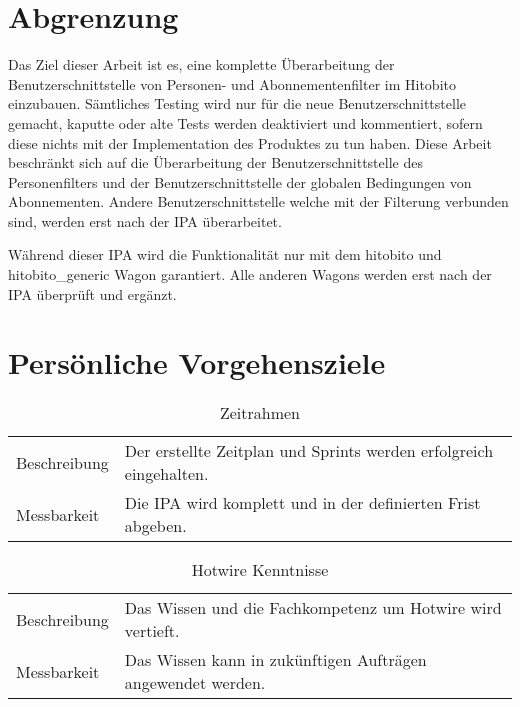 \section{Abgrenzung}
Das Ziel dieser Arbeit ist es, eine komplette Überarbeitung der Benutzerschnittstelle von Personen- und Abonnementenfilter im Hitobito einzubauen.
Sämtliches Testing wird nur für die neue Benutzerschnittstelle gemacht, kaputte oder alte Tests werden deaktiviert und
kommentiert, sofern diese nichts mit der Implementation des Produktes zu tun haben. Diese Arbeit beschränkt sich auf die Überarbeitung der Benutzerschnittstelle des Personenfilters
und der Benutzerschnittstelle der globalen Bedingungen von Abonnementen. Andere Benutzerschnittstelle welche mit der Filterung verbunden sind,
werden erst nach der IPA überarbeitet.

Während dieser IPA wird die Funktionalität nur mit dem hitobito und hitobito\_generic Wagon garantiert. Alle anderen Wagons 
werden erst nach der IPA überprüft und ergänzt.

\section{Persönliche Vorgehensziele}
\begin{table}[h!]
   \begin{tabular}{|L{0.4\textwidth}|L{0.5\textwidth}|}
       \hline
         \\[12pt]
       \hline
      Beschreibung & Der erstellte Zeitplan und Sprints werden erfolgreich eingehalten. \\
       \hline
       Messbarkeit & Die IPA wird komplett und in der definierten Frist abgeben. \\
       \hline
     \end{tabular}
     \caption{Zeitrahmen}
\end{table}

\begin{table}[h!]
   \begin{tabular}{|L{0.4\textwidth}|L{0.5\textwidth}|}
       \hline
         \\[12pt]
       \hline
       Beschreibung & Das Wissen und die Fachkompetenz um Hotwire wird vertieft. \\
       \hline
       Messbarkeit & Das Wissen kann in zukünftigen Aufträgen angewendet werden. \\
       \hline
     \end{tabular}
     \caption{Hotwire Kenntnisse}
\end{table}

